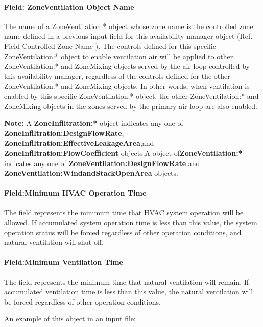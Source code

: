 \paragraph{Field: ZoneVentilation Object Name}\label{field-zoneventilation-object-name}

The name of a ZoneVentilation:* object whose zone name is the controlled zone name defined in a previous input field for this availability manager object (Ref. Field Controlled Zone Name ). The controls defined for this specific ZoneVentilation:* object to enable ventilation air will be applied to other ZoneVentilation:* and ZoneMixing objects served by the air loop controlled by this availability manager, regardless of the controls defined for the other ZoneVentilation:* and ZoneMixing objects. In other words, when ventilation is enabled by this specific ZoneVentilation:* object, the other ZoneVentilation:* and ZoneMixing objects in the zones served by the primary air loop are also enabled.

\textbf{Note:} A \textbf{ZoneInfiltration:*} object indicates any one of \textbf{ZoneInfiltration:DesignFlowRate}, \textbf{ZoneInfiltration:EffectiveLeakageArea},and \textbf{ZoneInfiltration:FlowCoefficient} objects.A object of\textbf{ZoneVentilation:*} indicates any one of \textbf{ZoneVentilation:DesignFlowRate} and \textbf{ZoneVentilation:WindandStackOpenArea} objects.

\paragraph{Field:Minimum HVAC Operation Time}\label{field-minimum-hvac-operation-time}

 The field represents the minimum time that HVAC system operation will be allowed. If accumulated system operation time is less than this value, the system operation status will be forced regardless of other operation conditions, and natural ventilation will shut off. 

\paragraph{Field:Minimum Ventilation Time}\label{field-minimum-ventilation-time}

 The field represents the minimum time that natural ventilation will remain. If accumulated ventilation time is less than this value, the natural ventilation will be forced regardless of other operation conditions. 


An example of this object in an input file:

